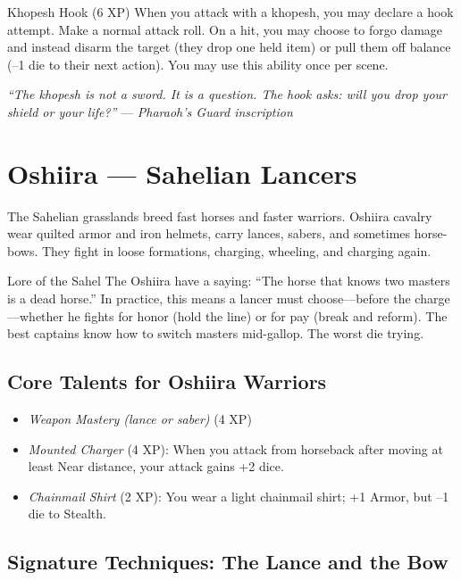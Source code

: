 \documentclass[9pt,a5paper]{extbook}
\begin{document}
\begin{talentbox}{Khopesh Hook (6 XP)}
When you attack with a khopesh, you may declare a hook attempt. Make a normal attack roll. On a hit, you may choose to forgo damage and instead disarm the target (they drop one held item) or pull them off balance (--1 die to their next action). You may use this ability once per scene.
\end{talentbox}

\vspace{0.2cm}
\noindent\textit{``The khopesh is not a sword. It is a question. The hook asks: will you drop your shield or your life?''}  
\hfill --- \textit{Pharaoh's Guard inscription}

\clearpage

\section{Oshiira --- Sahelian Lancers}

The Sahelian grasslands breed fast horses and faster warriors. Oshiira cavalry wear quilted armor and iron helmets, carry lances, sabers, and sometimes horse-bows. They fight in loose formations, charging, wheeling, and charging again.

\begin{warriorbox}{Lore of the Sahel}
The Oshiira have a saying: ``The horse that knows two masters is a dead horse.'' In practice, this means a lancer must choose---before the charge---whether he fights for honor (hold the line) or for pay (break and reform). The best captains know how to switch masters mid-gallop. The worst die trying.
\end{warriorbox}

\subsection{Core Talents for Oshiira Warriors}
\begin{itemize}
    \item \textit{Weapon Mastery (lance or saber)} (4 XP)
    \item \textit{Mounted Charger} (4 XP): When you attack from horseback after moving at least Near distance, your attack gains +2 dice.
    \item \textit{Chainmail Shirt} (2 XP): You wear a light chainmail shirt; +1 Armor, but --1 die to Stealth.
\end{itemize}

\subsection{Signature Techniques: The Lance and the Bow}
\end{document}
